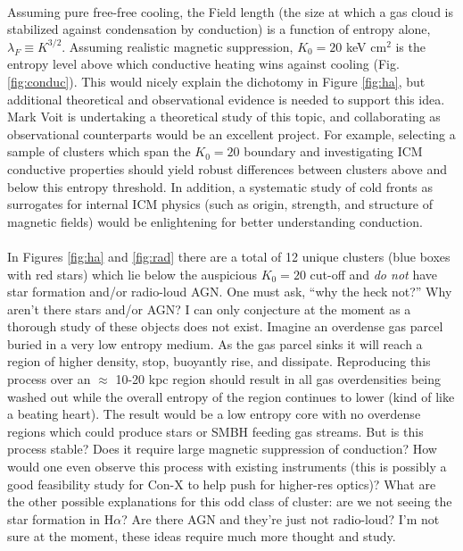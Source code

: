 \documentclass[11pt]{article}
\begin{document}
\\
Assuming pure free-free cooling, the Field length (the size at which a
gas cloud is stabilized against condensation by conduction) is a
function of entropy alone, $\lambda_F \equiv K^{3/2}$. Assuming
realistic magnetic suppression, $K_0 = 20$ keV cm$^2$ is the entropy
level above which conductive heating wins against cooling
(Fig. \ref{fig:conduc}). This would nicely explain the dichotomy in
Figure \ref{fig:ha}, but additional theoretical and observational
evidence is needed to support this idea. Mark Voit is undertaking a
theoretical study of this topic, and collaborating as observational
counterparts would be an excellent project. For example, selecting a
sample of clusters which span the $K_0 = 20$ boundary and
investigating ICM conductive properties should yield robust
differences between clusters above and below this entropy
threshold. In addition, a systematic study of cold fronts as
surrogates for internal ICM physics (such as origin, strength, and
structure of magnetic fields) would be enlightening for better
understanding conduction.\\

\\
In Figures \ref{fig:ha} and \ref{fig:rad} there are a total of 12
unique clusters (blue boxes with red stars) which lie below the
auspicious $K_0 = 20$ cut-off and {\it do not} have star formation
and/or radio-loud AGN. One must ask, ``why the heck not?''  Why aren't
there stars and/or AGN? I can only conjecture at the moment as a
thorough study of these objects does not exist. Imagine an overdense
gas parcel buried in a very low entropy medium. As the gas parcel
sinks it will reach a region of higher density, stop, buoyantly rise,
and dissipate. Reproducing this process over an $\approx$ 10-20 kpc
region should result in all gas overdensities being washed out
while the overall entropy of the region continues to lower (kind of
like a beating heart). The result would be a low entropy core with no
overdense regions which could produce stars or SMBH feeding gas
streams. But is this process stable? Does it require large magnetic
suppression of conduction? How would one even observe this process
with existing instruments (this is possibly a good feasibility study
for Con-X to help push for higher-res optics)? What are the other
possible explanations for this odd class of cluster: are we not seeing
the star formation in H$\alpha$? Are there AGN and they're just not
radio-loud? I'm not sure at the moment, these ideas require much more
thought and study.\\
\end{document}
